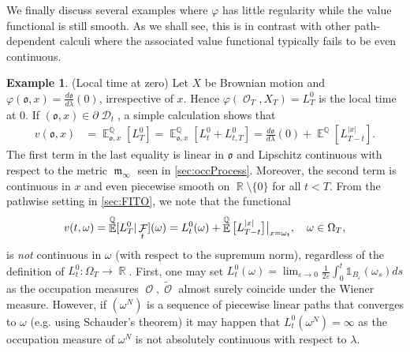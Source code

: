\documentclass[11pt]{article}
\def\mo{\mathfrak{o}}
\theoremstyle{plain}
\theoremstyle{definition}
\newtheorem{example}{Example}
\DeclareMathOperator{\E}{\mathbb{E}}
\DeclareMathOperator{\Q}{\mathbb{Q}}
\DeclareMathOperator{\R}{\mathbb{R}}
\DeclareMathOperator{\X}{\mathbb{X}}
\DeclareMathOperator{\calD}{\mathcal{D}}
\DeclareMathOperator{\calF}{\mathcal{F}}
\DeclareMathOperator{\calN}{\mathcal{N}}
\DeclareMathOperator{\calO}{\mathcal{O}}
\DeclareMathOperator{\frakm}{\mathfrak{m}}
\begin{document}
We finally discuss several examples where $\varphi$ has little regularity while the value functional is still smooth. As we shall see, this is in contrast with other path-dependent calculi %
where the  associated value functional typically fails to be even continuous. 
\begin{example}\label{ex:LT0}
\textnormal{(Local time at zero)} 
Let $X$ be Brownian motion and  $\varphi(\mo,x) =\frac{d\mo}{d\lambda}(0)$, irrespective of $x$. Hence  $\varphi(\calO_T,X_T) = L_T^0$ is the local time at $0$. 
If $(\mo,x)\in \partial\calD_t$, a simple calculation shows that 
  \begin{align*}
            v(\mo,x) &= \E^{\Q}_{\mo,x}[L_T^{0}] 
             =   \E^{\Q}_{\mo,x}\left[L_t^0 + L_{t,T}^{0}\right]  
               = \frac{d\mo}{d\lambda}(0)  +  \E^{\Q}[L_{T-t}^{|x|}].  %
        \end{align*}
         The first term in the last equality is linear in $\mo$ and Lipschitz continuous with respect to the metric $\frakm_{\infty}$ seen in \cref{sec:occProcess}. %
         Moreover, the second term is continuous in $x$  and even piecewise smooth on $\R\setminus \{0\}$ for all $t<T$. From  the pathwise setting  in \cref{sec:FITO}, we note that the functional 
         \begin{equation}\label{eq:loc0Fctal}
             \textnormal{v}(t,\omega) = \E^{\Q}[L_T^{0}  |   \calF_t](\omega) = L^0_t(\omega) + \E^{\Q}\big[L_{T-t}^{|x|}\big]\big |_{x=\omega_t}, \quad \omega\in \Omega_T, 
         \end{equation} 
         is \textit{not} continuous in $\omega$ (with respect to the supremum norm), regardless of the definition of  $L^0_t:\Omega_T \to \R$. %
         First, one may set 
         $L^0_t(\omega) = \lim_{\varepsilon \to 0} \frac{1}{2\varepsilon}\int_0^t \mathds{1}_{B_{\varepsilon}}(\omega_s)ds $ as the  occupation measures $\calO,\tilde{\calO}$ almost surely coincide under the Wiener measure. 
         However, if $(\omega^N)$ is a sequence of piecewise linear paths   that converges to  $\omega$ (e.g. using Schauder's theorem) it may  happen that $L^0_t(\omega^N) = \infty$ as the occupation measure of $\omega^N$ is not absolutely continuous with respect to $\lambda$. %

\end{example}
\end{document}
